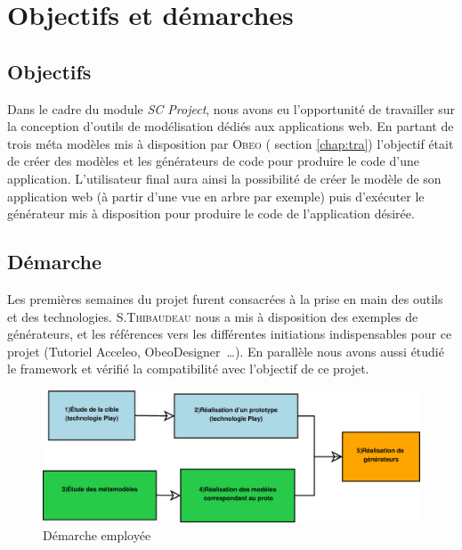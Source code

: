 \chapter{Objectifs et démarches}\label{chap:mod}


\section{Objectifs}
Dans le cadre du module \emph{SC Project}, nous avons eu l'opportunité de travailler sur la conception d'outils de modélisation dédiés aux applications web. En partant de trois méta modèles mis à disposition par \textsc{Obeo}
(\cf{} section \ref{chap:tra}) l'objectif était de créer des modèles et les générateurs de code pour produire le code d'une application. L'utilisateur final aura ainsi la possibilité de créer le modèle de son application web (à partir d'une vue en arbre par exemple) puis d'exécuter le générateur mis à disposition pour produire le code de l'application désirée.



\section{Démarche} 

Les premières semaines du projet furent consacrées à la prise en main des outils et des technologies. S.\textsc{Thibaudeau} nous a mis à disposition des exemples de générateurs, et les références vers les différentes initiations indispensables pour ce projet (Tutoriel Acceleo, ObeoDesigner~\dots). En parallèle nous avons aussi étudié le framework \kwplay{} et vérifié la compatibilité avec l'objectif de ce projet.

\begin{figure}[htb]
  \includegraphics[scale=.4]{img/demarche.eps}
  \caption{Démarche employée}
  \label{fig:dem}
\end{figure}

